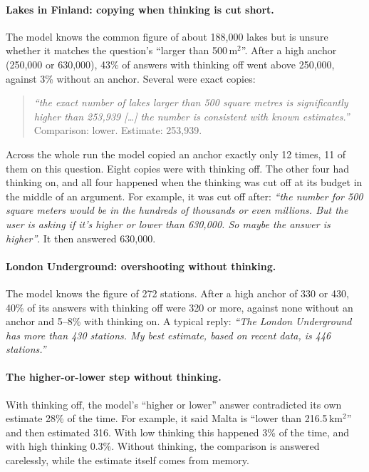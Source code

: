 \documentclass[11pt,a4paper]{article}
\newcommand{\quoteit}[1]{\emph{\enquote{#1}}}
\begin{document}
\paragraph{Lakes in Finland: copying when thinking is cut short.} The model knows the common figure of about 188,000 lakes but is unsure whether it matches the question's \enquote{larger than 500\,m$^2$}. After a high anchor (250,000 or 630,000), 43\% of answers with thinking off went above 250,000, against 3\% without an anchor. Several were exact copies:

\begin{quote}\small
\quoteit{the exact number of lakes larger than 500 square metres is significantly higher than 253,939 [\dots] the number is consistent with known estimates.} Comparison: lower. Estimate: 253,939.
\end{quote}

\noindent Across the whole run the model copied an anchor exactly only 12 times, 11 of them on this question. Eight copies were with thinking off. The other four had thinking on, and all four happened when the thinking was cut off at its budget in the middle of an argument. For example, it was cut off after: \quoteit{the number for 500 square meters would be in the hundreds of thousands or even millions. But the user is asking if it's higher or lower than 630,000. So maybe the answer is higher}. It then answered 630,000.

\paragraph{London Underground: overshooting without thinking.} The model knows the figure of 272 stations. After a high anchor of 330 or 430, 40\% of its answers with thinking off were 320 or more, against none without an anchor and 5--8\% with thinking on. A typical reply: \quoteit{The London Underground has more than 430 stations. My best estimate, based on recent data, is 446 stations.}

\paragraph{The higher-or-lower step without thinking.} With thinking off, the model's \enquote{higher or lower} answer contradicted its own estimate 28\% of the time. For example, it said Malta is \enquote{lower than 216.5\,km$^2$} and then estimated 316. With low thinking this happened 3\% of the time, and with high thinking 0.3\%. Without thinking, the comparison is answered carelessly, while the estimate itself comes from memory.
\end{document}
